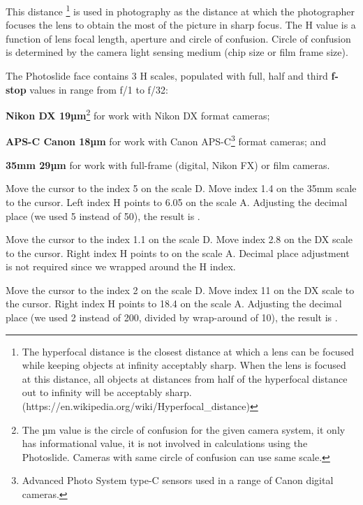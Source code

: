   \begin{multicols*}{3}
  \normalsize{

This distance \footnote{The hyperfocal distance is the closest distance at which a lens can be focused while keeping objects at infinity acceptably sharp. When the lens is focused at this distance, all objects at distances from half of the hyperfocal distance out to infinity will be acceptably sharp. (https://en.wikipedia.org/wiki/Hyperfocal\_distance)} is used in photography as the distance at which the photographer focuses the lens to obtain the most of the picture in sharp focus. The H value is a function of lens focal length, aperture and circle of confusion. Circle of confusion is determined by the camera light sensing medium (chip size or film frame size).

  The Photoslide face contains 3 H scales, populated with full, half and third \textbf{f-stop} values in range from f/1 to f/32:
    \begin{inparaenum}[a\upshape)]
      \item \textbf{Nikon DX 19µm}\footnote{The µm value is the circle of confusion for the given camera system, it only has informational value, it is not involved in calculations using the Photoslide. Cameras with same circle of confusion can use same scale.} for work with Nikon DX format cameras;
      \item \textbf{APS-C Canon 18µm} for work with Canon APS-C\footnote{Advanced Photo System type-C sensors used in a range of Canon digital cameras.} format cameras; and
      \item \textbf{35mm 29µm} for work with full-frame (digital, Nikon FX) or film cameras.
    \end{inparaenum}

Move the cursor to the index 5 on the scale D.
Move index 1.4 on the 35mm scale to the cursor.
Left index H points to 6.05 on the scale A.
Adjusting the decimal place (we used 5 instead of 50), the result is .

Move the cursor to the index 1.1 on the scale D.
Move index 2.8 on the DX scale to the cursor.
Right index H points to  on the scale A.
Decimal place adjustment is not required since we wrapped around the H index.

Move the cursor to the index 2 on the scale D.
Move index 11 on the DX scale to the cursor.
Right index H points to 18.4 on the scale A.
Adjusting the decimal place (we used 2 instead of 200, divided by wrap-around of 10), the result is .
\vfill\columnbreak

}
\end{multicols*}
